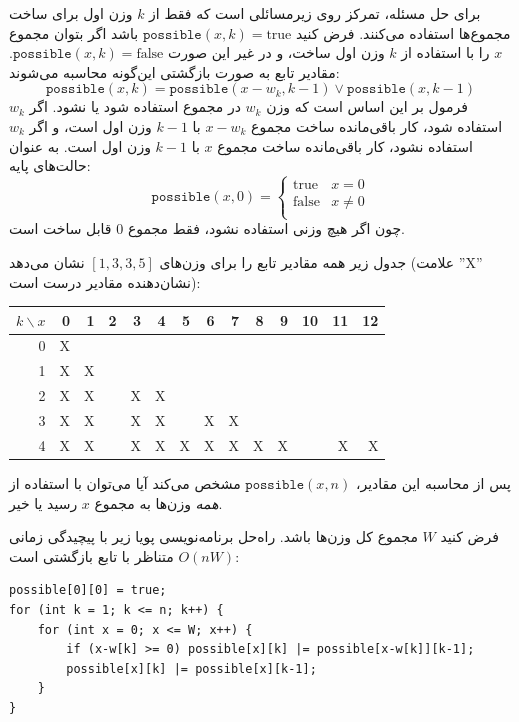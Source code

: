برای حل مسئله، تمرکز روی زیرمسائلی است
که فقط از $k$ وزن اول برای ساخت مجموع‌ها استفاده می‌کنند.
فرض کنید $\texttt{possible}(x,k)=\textrm{true}$ باشد اگر
بتوان مجموع $x$ را با استفاده از $k$ وزن اول ساخت،
و در غیر این صورت $\texttt{possible}(x,k)=\textrm{false}$.
مقادیر تابع به صورت بازگشتی این‌گونه محاسبه می‌شوند:
\[ \texttt{possible}(x,k) = \texttt{possible}(x-w_k,k-1) \lor \texttt{possible}(x,k-1) \]
فرمول بر این اساس است که وزن $w_k$ در مجموع استفاده شود یا نشود.
اگر $w_k$ استفاده شود، کار باقی‌مانده ساخت مجموع $x-w_k$ با $k-1$ وزن اول است،
و اگر $w_k$ استفاده نشود،
کار باقی‌مانده ساخت مجموع $x$ با $k-1$ وزن اول است.
به عنوان حالت‌های پایه:
\begin{equation*}
    \texttt{possible}(x,0) = \begin{cases}
               \textrm{true}    & x = 0\\
               \textrm{false}   & x \neq 0 \\
           \end{cases}
\end{equation*}
چون اگر هیچ وزنی استفاده نشود،
فقط مجموع 0 قابل ساخت است.

جدول زیر همه مقادیر تابع را برای وزن‌های $[1,3,3,5]$ نشان می‌دهد (علامت ''X'' نشان‌دهنده مقادیر درست است):

\begin{center}
\begin{tabular}{r|rrrrrrrrrrrrr}
$k \backslash x$ & 0 & 1 & 2 & 3 & 4 & 5 & 6 & 7 & 8 & 9 & 10 & 11 & 12 \\
\hline
 0 & X & \\
 1 & X & X \\
 2 & X & X & & X & X \\
 3 & X & X & & X & X & & X & X \\
 4 & X & X & & X & X & X & X & X & X & X & & X & X \\
\end{tabular}
\end{center}

پس از محاسبه این مقادیر، $\texttt{possible}(x,n)$ مشخص می‌کند آیا می‌توان با استفاده از \emph{همه} وزن‌ها به مجموع $x$ رسید یا خیر.

فرض کنید $W$ مجموع کل وزن‌ها باشد. راه‌حل برنامه‌نویسی پویا زیر با پیچیدگی زمانی $O(nW)$ متناظر با تابع بازگشتی است:
\begin{lstlisting}
possible[0][0] = true;
for (int k = 1; k <= n; k++) {
    for (int x = 0; x <= W; x++) {
        if (x-w[k] >= 0) possible[x][k] |= possible[x-w[k]][k-1];
        possible[x][k] |= possible[x][k-1];
    }
}
\end{lstlisting}

